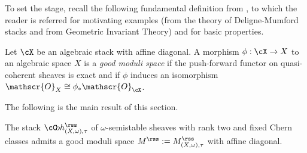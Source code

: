 To set the stage, recall the following fundamental definition from \cite{Alper13}, to which the reader is referred for motivating examples (\eg from the theory of Deligne-Mumford stacks and from Geometric Invariant Theory) and for basic properties.
\begin{Defi}
Let $\cX$ be an algebraic stack with affine diagonal. A morphism $\phi: \cX \to X$ to an algebraic space $X$ is a \emph{good moduli space} if the push-forward functor on quasi-coherent sheaves is exact and if $\phi$ induces an isomorphism $\mathscr{O}_X \cong\phi_*\mathscr{O}_{\cX} $.
\end{Defi}

The following is the main result of this section.
\begin{thm}[Existence]\label{thm:existence} The stack $\cC\!oh_{(X,\omega),\tau}^{{\rss}}$ of $\omega$-semistable sheaves with rank two and fixed Chern classes admits a good moduli space $M^{{\rss}}:=M_{(X,\omega),\tau}^{{\rss}}$ with affine diagonal.
\end{thm}

